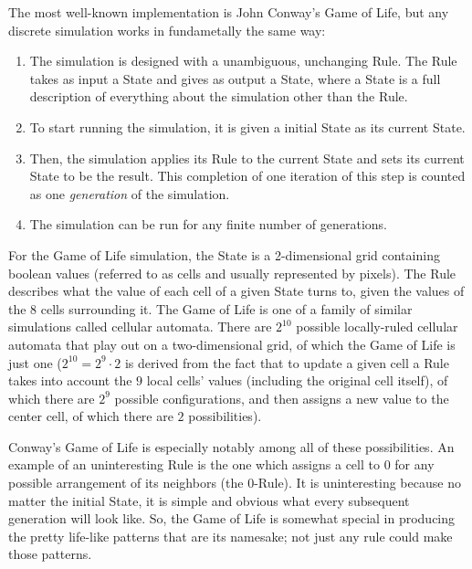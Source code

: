 \documentclass{article}
\newcommand{\ti}[1]{\textit{#1}}
\begin{document}

The most well-known implementation is John Conway's Game of Life, but any discrete simulation works in fundametally the same way:

\begin{enumerate}
\item The simulation is designed with a unambiguous, unchanging Rule. The Rule takes as input a State and gives as output a State, where a State is a full description of everything about the simulation other than the Rule.
\item To start running the simulation, it is given a initial State as its current State.
\item Then, the simulation applies its Rule to the current State and sets its current State to be the result. This completion of one iteration of this step is counted as one \ti{generation} of the simulation.
\item The simulation can be run for any finite number of generations.
\end{enumerate}

For the Game of Life simulation, the State is a 2-dimensional grid containing boolean values (referred to as cells and usually represented by pixels). The Rule describes what the value of each cell of a given State turns to, given the values of the 8 cells surrounding it. The Game of Life is one of a family of similar simulations called cellular automata. There are $2^{10}$ possible locally-ruled cellular automata that play out on a two-dimensional grid, of which the Game of Life is just one ($2^{10} = 2^9 \cdot 2$ is derived from the fact that to update a given cell a Rule takes into account the $9$ local cells' values (including the original cell itself), of which there are $2^9$ possible configurations, and then assigns a new value to the center cell, of which there are $2$ possibilities).

Conway's Game of Life is especially notably among all of these possibilities. An example of an uninteresting Rule is the one which assigns a cell to $0$ for any possible arrangement of its neighbors (the $0$-Rule). It is uninteresting because no matter the initial State, it is simple and obvious what every subsequent generation will look like. So, the Game of Life is somewhat special in producing the pretty life-like patterns that are its namesake; not just any rule could make those patterns.
\end{document}
